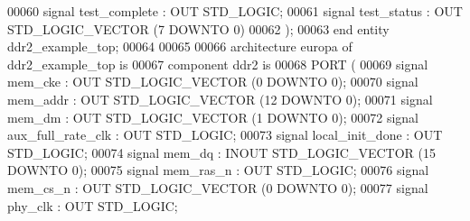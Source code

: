 \begin{DoxyCode}
{00060                  \textcolor{keywordflow}{signal} \textcolor{vhdlchar}{test_complete} \textcolor{vhdlchar}{:} \textcolor{keywordflow}{OUT} \textcolor{comment}{STD\_LOGIC};
00061                  \textcolor{keywordflow}{signal} \textcolor{vhdlchar}{test_status} \textcolor{vhdlchar}{:} \textcolor{keywordflow}{OUT} \textcolor{comment}{STD\_LOGIC\_VECTOR} \textcolor{vhdlchar}{(}\textcolor{vhdllogic}{}\textcolor{vhdllogic}{7} \textcolor{keywordflow}{DOWNTO} \textcolor{vhdllogic}{}\textcolor{vhdllogic}{0}\textcolor{vhdlchar}{)}
00062               \textcolor{vhdlchar}{)};
00063 \textcolor{keywordflow}{end} \textcolor{keywordflow}{entity} \textcolor{vhdlchar}{ddr2\_example\_top};
00064 
00065 
00066 \textcolor{keywordflow}{architecture} europa \textcolor{keywordflow}{of} ddr2_example_top is
00067   \textcolor{keywordflow}{component} ddr2 \textcolor{keywordflow}{is}
00068 \textcolor{keywordflow}{PORT} (
00069     \textcolor{keywordflow}{signal} mem_cke : \textcolor{keywordflow}{OUT} \textcolor{comment}{STD\_LOGIC\_VECTOR} (\textcolor{vhdllogic}{}\textcolor{vhdllogic}{0} \textcolor{keywordflow}{DOWNTO} \textcolor{vhdllogic}{}\textcolor{vhdllogic}{0});
00070         \textcolor{keywordflow}{signal} mem_addr : \textcolor{keywordflow}{OUT} \textcolor{comment}{STD\_LOGIC\_VECTOR} (\textcolor{vhdllogic}{}\textcolor{vhdllogic}{12} \textcolor{keywordflow}{DOWNTO} \textcolor{vhdllogic}{}\textcolor{vhdllogic}{0});
00071         \textcolor{keywordflow}{signal} mem_dm : \textcolor{keywordflow}{OUT} \textcolor{comment}{STD\_LOGIC\_VECTOR} (\textcolor{vhdllogic}{}\textcolor{vhdllogic}{1} \textcolor{keywordflow}{DOWNTO} \textcolor{vhdllogic}{}\textcolor{vhdllogic}{0});
00072         \textcolor{keywordflow}{signal} aux_full_rate_clk : \textcolor{keywordflow}{OUT} \textcolor{comment}{STD\_LOGIC};
00073         \textcolor{keywordflow}{signal} local_init_done : \textcolor{keywordflow}{OUT} \textcolor{comment}{STD\_LOGIC};
00074         \textcolor{keywordflow}{signal} mem_dq : \textcolor{keywordflow}{INOUT} \textcolor{comment}{STD\_LOGIC\_VECTOR} (\textcolor{vhdllogic}{}\textcolor{vhdllogic}{15} \textcolor{keywordflow}{DOWNTO} \textcolor{vhdllogic}{}\textcolor{vhdllogic}{0});
00075         \textcolor{keywordflow}{signal} mem_ras_n : \textcolor{keywordflow}{OUT} \textcolor{comment}{STD\_LOGIC};
00076         \textcolor{keywordflow}{signal} mem_cs_n : \textcolor{keywordflow}{OUT} \textcolor{comment}{STD\_LOGIC\_VECTOR} (\textcolor{vhdllogic}{}\textcolor{vhdllogic}{0} \textcolor{keywordflow}{DOWNTO} \textcolor{vhdllogic}{}\textcolor{vhdllogic}{0});
00077         \textcolor{keywordflow}{signal} phy_clk : \textcolor{keywordflow}{OUT} \textcolor{comment}{STD\_LOGIC};
}
\end{DoxyCode}
